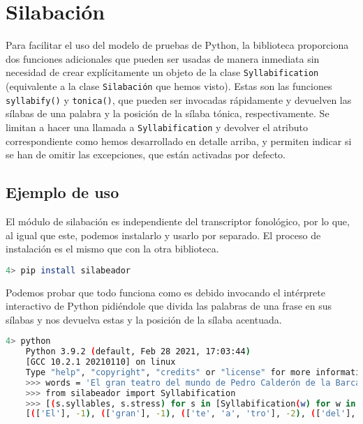 \section*{Silabación}
Para facilitar el uso del modelo de pruebas de Python, la biblioteca proporciona dos funciones adicionales que pueden ser usadas de manera inmediata  sin necesidad de crear explícitamente un objeto de la clase \texttt{Syllabification} (equivalente a la clase \texttt{Silabación} que hemos visto). Estas son las funciones \texttt{syllabify()} y \texttt{tonica()}, que pueden ser invocadas rápidamente y devuelven las sílabas de una palabra y la posición de la sílaba tónica, respectivamente. Se limitan a hacer una llamada a \texttt{Syllabification} y devolver el atributo correspondiente como hemos desarrollado en detalle arriba, y permiten indicar si se han de omitir las excepciones, que están activadas por defecto.

\subsection*{Ejemplo de uso}
El módulo de silabación es independiente del transcriptor fonológico, por lo que, al igual que este, podemos instalarlo y usarlo por separado. El proceso de instalación es el mismo que con la otra biblioteca.

\begin{lstlisting}[numbers=none, frame=none, keywordstyle=\ttfamily,  language=bash]
	4> pip install silabeador
\end{lstlisting} %
Podemos probar que todo funciona como es debido invocando el intérprete interactivo de Python pidiéndole que divida las palabras de una frase en sus sílabas y nos devuelva estas y la posición de la sílaba acentuada.
\begin{lstlisting}[numbers=none, frame=none, keywordstyle=\ttfamily,  language=bash]
	4> python
	Python 3.9.2 (default, Feb 28 2021, 17:03:44) 
	[GCC 10.2.1 20210110] on linux
	Type "help", "copyright", "credits" or "license" for more information.
	>>> words = 'El gran teatro del mundo de Pedro Calderón de la Barca'
	>>> from silabeador import Syllabification
	>>> [(s.syllables, s.stress) for s in [Syllabification(w) for w in sentence.split()]]
	[(['El'], -1), (['gran'], -1), (['te', 'a', 'tro'], -2), (['del'], -1), (['mun', 'do'], -2), (['de'], -1), (['Pe', 'dro'], -2), (['Cal', 'de', 'rón'], -1), (['de'], -1), (['la'], -1), (['Bar', 'ca'], -2)]
\end{lstlisting}

